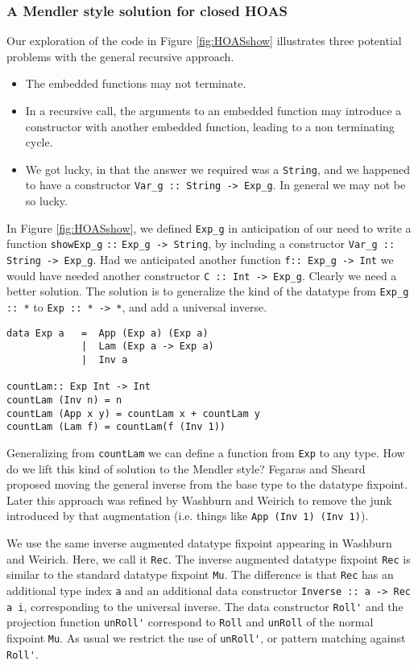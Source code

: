 \subsubsection{A Mendler style solution for closed HOAS}
\label{sec:bg:showHOAS:msfcata}

Our exploration of the code in Figure \ref{fig:HOASshow} illustrates
three potential problems with the general recursive approach.
\begin{itemize}
\item The embedded functions may not terminate.
\item In a recursive call, the arguments to an embedded function
may introduce a constructor with another embedded function, leading to
a non terminating cycle.
\item We got lucky, in that the answer we required was a \verb|String|, and
we happened to have a constructor \verb|Var_g :: String -> Exp_g|.
In general we may not be so lucky.
\end{itemize}

In Figure \ref{fig:HOASshow}, we defined \verb|Exp_g| in anticipation of
our need to write a function \verb|showExp_g| \verb|::| \verb|Exp_g -> String|,
by including a constructor \verb|Var_g :: String -> Exp_g|.
Had we anticipated another function \verb|f:: Exp_g -> Int|
we would have needed another  constructor \verb|C :: Int -> Exp_g|.
Clearly we need a better solution.  The solution is to generalize the kind of
the datatype from \verb|Exp_g :: *| to \verb|Exp :: * -> *|, and add
a universal inverse.
\begin{verbatim}
data Exp a   =  App (Exp a) (Exp a)
             |  Lam (Exp a -> Exp a)
             |  Inv a

countLam:: Exp Int -> Int   
countLam (Inv n) = n
countLam (App x y) = countLam x + countLam y
countLam (Lam f) = countLam(f (Inv 1))
\end{verbatim}
Generalizing from \verb|countLam| we can define a function from \verb|Exp|
to any type. How do we lift this kind of solution to the Mendler style?
Fegaras and Sheard\cite{FegShe96} proposed moving the general inverse from
the base type to the datatype fixpoint. Later this approach was refined by
Washburn and Weirich\cite{bgb} to remove the junk introduced by
that augmentation (i.e. things like \verb|App (Inv 1) (Inv 1)|).

We use the same inverse augmented datatype fixpoint appearing in
Washburn and Weirich\cite{bgb}.  Here, we call it \verb|Rec|.
The inverse augmented datatype fixpoint \verb|Rec| is similar to
the standard datatype fixpoint \verb|Mu|.
The difference is that \verb|Rec| has an additional type index \verb|a|
and an additional data constructor \verb|Inverse :: a -> Rec a i|,
corresponding to the universal inverse.
The data constructor \verb|Roll'| and the projection function \verb|unRoll'|
correspond to \verb|Roll| and \verb|unRoll| of the normal fixpoint \verb|Mu|.
As usual we restrict the use of \verb|unRoll'|, or pattern matching against
\verb|Roll'|.

